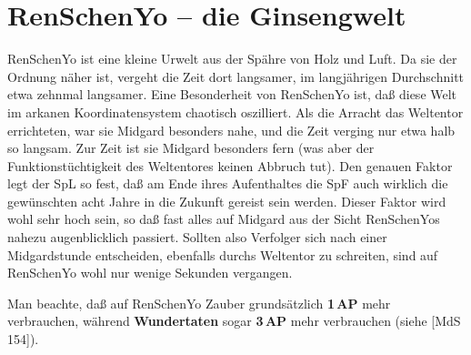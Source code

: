 \documentclass[
a4paper,
twoside,
DIV=calc,
BCOR=4mm,
fontsize=9pt,
twocolumn=on,
titlepage=on,
parskip=half
]{scrartcl}
\begin{document}
\section{RenSchenYo -- die Ginsengwelt}

RenSchenYo ist eine kleine Urwelt aus der Spähre von Holz und Luft. Da
sie der Ordnung näher ist, vergeht die Zeit dort langsamer, im
langjährigen Durchschnitt etwa zehnmal langsamer. Eine Besonderheit
von RenSchenYo ist, daß diese Welt im arkanen Koordinatensystem
chaotisch oszilliert. Als die Arracht das Weltentor errichteten, war
sie Midgard besonders nahe, und die Zeit verging nur etwa halb so
langsam. Zur Zeit ist sie Midgard besonders fern (was aber der
Funktionstüchtigkeit des Weltentores keinen Abbruch tut). Den genauen
Faktor legt der SpL so fest, daß am Ende ihres Aufenthaltes die SpF
auch wirklich die gewünschten acht Jahre in die Zukunft gereist sein
werden. Dieser Faktor wird wohl sehr hoch sein, so daß fast alles auf
Midgard aus der Sicht RenSchenYos nahezu augenblicklich
passiert. Sollten also Verfolger sich nach einer Midgardstunde
entscheiden, ebenfalls durchs Weltentor zu schreiten, sind auf
RenSchenYo wohl nur wenige Sekunden vergangen.

Man beachte, daß auf RenSchenYo Zauber grundsätzlich \textbf{1\,AP}
mehr verbrauchen, während \textbf{Wundertaten} sogar \textbf{3\,AP}
mehr verbrauchen (siehe [MdS\,154]).
\end{document}
